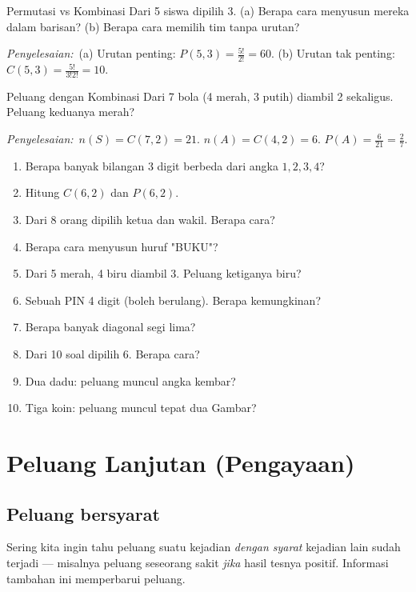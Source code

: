 \documentclass[11pt,a4paper]{report}
\theoremstyle{gaya}
\newcommand{\jawab}{\par\smallskip\noindent\textit{\textcolor{oranye}{Penyelesaian:}}\ }
\begin{document}
\begin{contoh}{Permutasi vs Kombinasi}
Dari 5 siswa dipilih 3. (a) Berapa cara menyusun mereka dalam barisan? (b) Berapa cara memilih tim tanpa urutan?

\jawab (a) Urutan penting: $P(5,3)=\tfrac{5!}{2!}=60$. (b) Urutan tak penting: $C(5,3)=\tfrac{5!}{3!2!}=10$.
\end{contoh}

\begin{contoh}{Peluang dengan Kombinasi}
Dari 7 bola (4 merah, 3 putih) diambil 2 sekaligus. Peluang keduanya merah?

\jawab $n(S)=C(7,2)=21$. $n(A)=C(4,2)=6$. $P(A)=\tfrac{6}{21}=\tfrac27$.
\end{contoh}

\begin{latihan}
\begin{enumerate}[leftmargin=*]
  \item Berapa banyak bilangan 3 digit berbeda dari angka $1,2,3,4$?
  \item Hitung $C(6,2)$ dan $P(6,2)$.
  \item Dari 8 orang dipilih ketua dan wakil. Berapa cara?
  \item Berapa cara menyusun huruf "BUKU"?
  \item Dari 5 merah, 4 biru diambil 3. Peluang ketiganya biru?
  \item Sebuah PIN 4 digit (boleh berulang). Berapa kemungkinan?
  \item Berapa banyak diagonal segi lima?
  \item Dari 10 soal dipilih 6. Berapa cara?
  \item Dua dadu: peluang muncul angka kembar?
  \item Tiga koin: peluang muncul tepat dua Gambar?
\end{enumerate}
\end{latihan}

\section{Peluang Lanjutan (Pengayaan)}

\subsection*{Peluang bersyarat}
Sering kita ingin tahu peluang suatu kejadian \emph{dengan syarat} kejadian lain sudah terjadi --- misalnya peluang seseorang sakit \emph{jika} hasil tesnya positif. Informasi tambahan ini memperbarui peluang.
\end{document}
